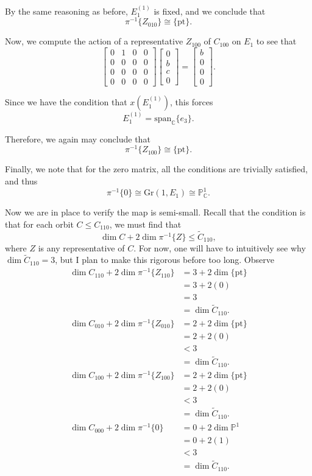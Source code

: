 \documentclass{memoir}
\newcommand{\mb}{\mathbb}
\newcommand{\bc}{\mathbb{C}}
\newcommand{\tx}{\text}
\theoremstyle{definition}
\begin{document}
	By the same reasoning as before, $E_1^{(1)}$ is fixed, and we conclude that 
	$$\pi^{-1}\{Z_{010}\}\cong\{\tx{pt}\}.$$
	
	Now, we compute the action of a representative $Z_{100}$ of $C_{100}$ on $E_1$ to see that 
	$$\begin{bmatrix}
		0 & 1 & 0 & 0 \\
		0 & 0 & 0 & 0 \\
		0 & 0 & 0 & 0 \\
		0 & 0 & 0 & 0
	\end{bmatrix}\begin{bmatrix}
	0 \\
	b \\
	c \\
	0
\end{bmatrix}=\begin{bmatrix}
	b \\
	0 \\ 
	0 \\
	0
\end{bmatrix}.$$
	
	Since we have the condition that $x(E_1^{(1)})$, this forces
	$$E_1^{(1)}=\tx{span}_{\bc}\{e_3\}.$$
	
	Therefore, we again may conclude that
	 $$\pi^{-1}\{Z_{100}\}\cong\{\tx{pt}\}.$$ 
	
	Finally, we note that for the zero matrix, all the conditions are trivially satisfied, and thus
	$$\pi^{-1}\{0\}\cong \tx{Gr}(1, E_1)\cong \mb{P}_{\bc}^1.$$
	
	Now we are in place to verify the map is semi-small.  
	Recall that the condition is that for each orbit $C\leq C_{110}$, we must find that 
	$$\dim C+2\dim\pi^{-1}\{Z\}\leq \tilde{C}_{110},$$
	where $Z$ is any representative of $C$.  
	For now, one will have to intuitively see why $\dim\tilde{C}_{110}=3$, but I plan to make this rigorous before too long.  
	Observe
	\begin{align*}
		\dim C_{110}+2\dim \pi^{-1}\{Z_{110}\}&=3+2\dim\{\tx{pt}\}\\
		&=3+2(0)\\
		&=3\\
		&=\dim\tilde{C}_{110}.  \\
			\dim C_{010}+2\dim \pi^{-1}\{Z_{010}\}&=2+2\dim\{\tx{pt}\}\\
		&=2+2(0)\\
		&<3\\
		&=\dim\tilde{C}_{110}.\\
			\dim C_{100}+2\dim \pi^{-1}\{Z_{100}\}&=2+2\dim\{\tx{pt}\}\\
		&=2+2(0)\\
		&<3\\
		&=\dim\tilde{C}_{110}.\\
			\dim C_{000}+2\dim \pi^{-1}\{0\}&=0+2\dim\mb{P}^1\\
		&=0+2(1)\\
		&<3\\
		&=\dim\tilde{C}_{110}.
	\end{align*}
\end{document}
